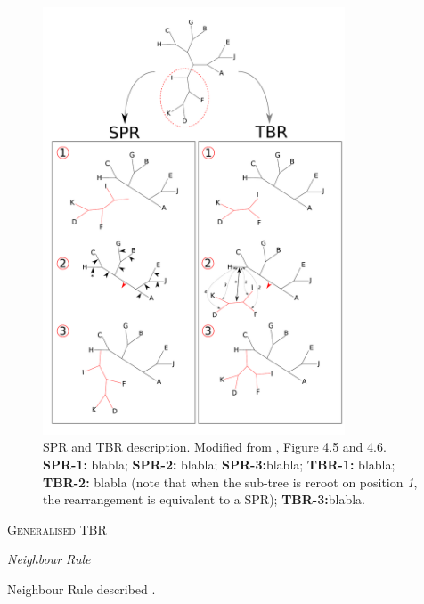 \documentclass[12pt,letterpaper]{article}
\renewcommand{\section}[1]{%
\bigskip
\begin{center}
\begin{Large}
\normalfont\scshape #1
\medskip
\end{Large}
\end{center}}
\renewcommand{\subsection}[1]{%
\bigskip
\begin{center}
\begin{large}
\normalfont\itshape #1
\end{large}
\end{center}}
\begin{document}
\begin{figure}[!htbp]
\centering
   \includegraphics[width=0.8\textwidth]{Figure/FelsensteinFigure.pdf}
\caption{\scriptsize{SPR and TBR description. Modified from \cite{felsenstein2004inferring}, Figure 4.5 and 4.6. \textbf{SPR-1:} blabla; \textbf{SPR-2:} blabla; \textbf{SPR-3:}blabla; \textbf{TBR-1:} blabla; \textbf{TBR-2:} blabla (note that when the sub-tree is reroot on position \textit{1}, the rearrangement is equivalent to a SPR); \textbf{TBR-3:}blabla.}}
\label{Figure_Felsenstein}
\end{figure}


\section{Generalised TBR}


\subsection{Neighbour Rule}
Neighbour Rule described \citep[in other words;][]{allen2001subtree}.
\end{document}
